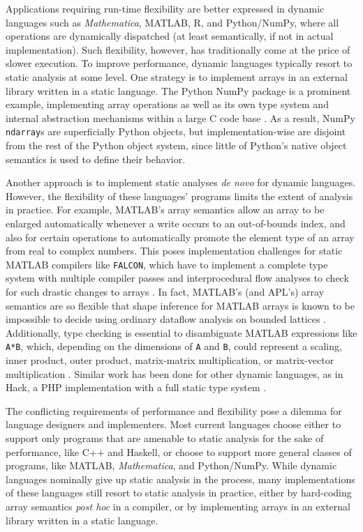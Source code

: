 \documentclass{sigplanconf}
\newcommand{\MATLAB}{\textsc{MATLAB}}
\newcommand{\Mathematica}{\textit{Mathematica}}
\newcommand{\code}[1]{\texttt{#1}}
\begin{document}
Applications requiring run-time flexibility are better expressed in
dynamic languages such as \Mathematica, \MATLAB, R, and Python/NumPy, where
all operations are dynamically dispatched (at least semantically, if not
in actual implementation). Such flexibility,
however, has traditionally come at the price of slower execution.
To improve performance, dynamic languages typically resort to static analysis
at some level.
One strategy is to implement arrays in an external library
written in a static language.
The Python NumPy package is a prominent example, implementing array operations
as well as its own type system and internal abstraction mechanisms within
a large C code base \cite{Walt:2011np}. As a result, NumPy \code{ndarray}s are
superficially Python objects, but implementation-wise are disjoint from the
rest of the Python object system, since little of Python's native object
semantics is used to define their behavior.

Another approach is to implement static analyses
\textit{de novo} for dynamic languages. However, the flexibility
of these languages' programs limits the extent of analysis in practice. For example, \MATLAB's array
semantics allow an array to be enlarged automatically whenever a write occurs
to an out-of-bounds index, and also for certain operations to
automatically promote the element type of an array from real to complex
numbers. This poses implementation challenges for static \MATLAB{} compilers
like \code{FALCON}, which have to implement a complete type system with
multiple compiler passes and interprocedural flow analyses to check
for such drastic changes to arrays \cite{Rose:1999tt,
Li:2013mf}. In fact, \MATLAB's (and APL's) array semantics are so flexible that
shape inference for \MATLAB{} arrays is known to be impossible to decide using
ordinary dataflow analysis on bounded lattices \cite{Joisha:2006aa}.
Additionally, type checking is essential to disambiguate
\MATLAB{} expressions like \code{A*B}, which, depending on the dimensions of
\code{A} and \code{B}, could represent a scaling, inner product, outer
product, matrix-matrix multiplication, or matrix-vector multiplication
\cite{Rose:1999tt}. Similar work has been done for other dynamic languages,
as in Hack, a PHP implementation with a full static type system
\cite{Verlaguet:2014hn}.


The conflicting requirements of performance and flexibility pose a dilemma for
language designers and implementers. Most current languages choose either to
support only programs that are amenable to static analysis for the sake of
performance, like C++ and Haskell, or choose to support more general
classes of programs, like \MATLAB, \Mathematica, and Python/NumPy. While
dynamic languages nominally give up static analysis in the process, many
implementations of these languages still resort to static analysis in
practice, either by hard-coding array semantics \textit{post hoc} in a compiler, or by
implementing arrays in an external library written in a static language.
\end{document}
